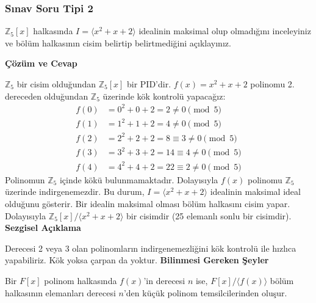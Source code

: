 \documentclass[11pt, a4paper]{article}
\newenvironment{cozum}{
    \vspace{0.5cm}
    \noindent\textcolor{green!60!black}{\faCheckCircle\enspace \textbf{\Large Çözüm ve Cevap}}\par\vspace{0.2cm}
}{}
\newenvironment{sezgisel}{
    \vspace{0.5cm}
    \noindent\textcolor{orange!80!black}{\faLightbulb\enspace \textbf{\Large Sezgisel Açıklama}}\par\vspace{0.2cm}
    \itshape
}{}
\newenvironment{bilgi}{
    \vspace{0.5cm}
    \noindent\textcolor{red!70!black}{\faExclamationTriangle\enspace \textbf{\Large Bilinmesi Gereken Şeyler}}\par\vspace{0.2cm}
}{}
\begin{document}
\subsubsection{Sınav Soru Tipi 2}
\begin{sinavbox}
$\mathbb{Z}_{5}[x]$ halkasında $I = \langle x^2+x+2 \rangle$ idealinin maksimal olup olmadığını inceleyiniz ve bölüm halkasının cisim belirtip belirtmediğini açıklayınız.
\end{sinavbox}
\begin{cozum}
$\mathbb{Z}_5$ bir cisim olduğundan $\mathbb{Z}_5[x]$ bir PID'dir. $f(x) = x^2+x+2$ polinomu 2. dereceden olduğundan $\mathbb{Z}_5$ üzerinde kök kontrolü yapacağız:
\begin{align*}
f(0) &= 0^2+0+2 = 2 \neq 0 \pmod 5 \\
f(1) &= 1^2+1+2 = 4 \neq 0 \pmod 5 \\
f(2) &= 2^2+2+2 = 8 \equiv 3 \neq 0 \pmod 5 \\
f(3) &= 3^2+3+2 = 14 \equiv 4 \neq 0 \pmod 5 \\
f(4) &= 4^2+4+2 = 22 \equiv 2 \neq 0 \pmod 5
\end{align*}
Polinomun $\mathbb{Z}_5$ içinde kökü bulunmamaktadır. Dolayısıyla $f(x)$ polinomu $\mathbb{Z}_5$ üzerinde indirgenemezdir. Bu durum, $I = \langle x^2+x+2 \rangle$ idealinin maksimal ideal olduğunu gösterir. Bir idealin maksimal olması bölüm halkasını cisim yapar. Dolayısıyla $\mathbb{Z}_5[x] / \langle x^2+x+2 \rangle$ bir cisimdir (25 elemanlı sonlu bir cisimdir).
\end{cozum}
\begin{sezgisel}
Derecesi 2 veya 3 olan polinomların indirgenemezliğini kök kontrolü ile hızlıca yapabiliriz. Kök yoksa çarpan da yoktur.
\end{sezgisel}
\begin{bilgi}
Bir $F[x]$ polinom halkasında $f(x)$'in derecesi $n$ ise, $F[x]/\langle f(x) \rangle$ bölüm halkasının elemanları derecesi $n$'den küçük polinom temsilcilerinden oluşur.
\end{bilgi}

\newpage
\end{document}
